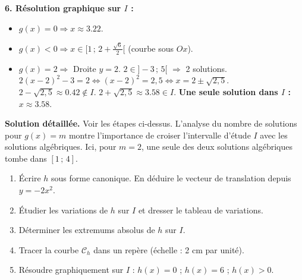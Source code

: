 \documentclass[11pt]{article}
\begin{document}
\begin{exoresolu}[{Exercice type Probatoire : $g(x) = 2x^2 - 8x + 5$ sur $I=[1\,;\,4]$}]
\textbf{6. Résolution graphique sur $I$ :}
\begin{itemize}
    \item $g(x)=0 \Rightarrow x \approx \num{3,22}$.
    \item $g(x) < 0 \Rightarrow x \in [1\,;\, 2+\frac{\sqrt{6}}{2}[$ (courbe sous $Ox$).
    \item $g(x) = 2 \Rightarrow$ Droite $y=2$. $2 \in ]-3\,;\,5[$ $\Rightarrow$ 2 solutions. 
          $2(x-2)^2-3=2 \Leftrightarrow (x-2)^2=2,5 \Leftrightarrow x=2\pm\sqrt{2,5}$. 
          $2-\sqrt{2,5} \approx \num{0,42} \notin I$. $2+\sqrt{2,5} \approx \num{3,58} \in I$.
          \textbf{Une seule solution dans $I$ : $x \approx \num{3,58}$}.
\end{itemize}
\tcblower
\textbf{Solution détaillée.}
Voir les étapes ci-dessus. L'analyse du nombre de solutions pour $g(x)=m$ montre l'importance de croiser l'intervalle d'étude $I$ avec les solutions algébriques. Ici, pour $m=2$, une seule des deux solutions algébriques tombe dans $[1\,;\,4]$.
\end{exoresolu}

\begin{exercice}[{Entraînement : $h(x) = -2x^2 + 4x + 6$ sur $I=[-1\,;\,3]$}]
\begin{enumerate}
    \item Écrire $h$ sous forme canonique. En déduire le vecteur de translation depuis $y=-2x^2$.
    \item Étudier les variations de $h$ sur $I$ et dresser le tableau de variations.
    \item Déterminer les extremums absolus de $h$ sur $I$.
    \item Tracer la courbe $\mathcal{C}_h$ dans un repère (échelle : 2 cm par unité).
    \item Résoudre graphiquement sur $I$ : $h(x)=0$ ; $h(x)=6$ ; $h(x) > 0$.
\end{enumerate}
\end{exercice}
\end{document}
